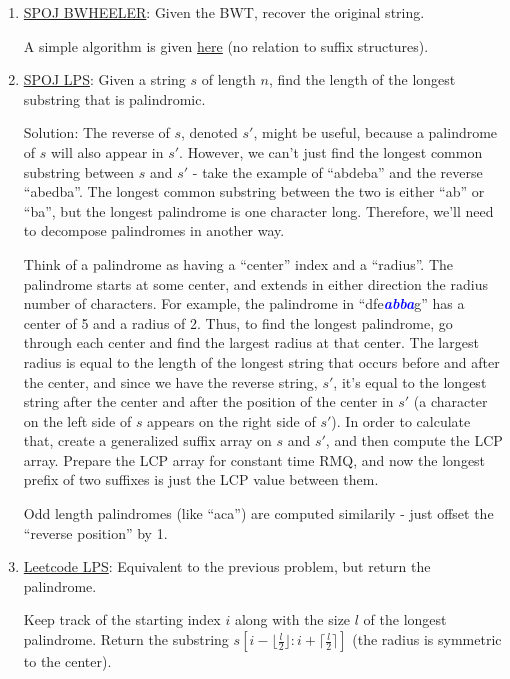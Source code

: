 \documentclass[11pt, oneside]{article}
\newcommand{\emphasis}[1]{\textcolor{blue}{\textbf{\textit{#1}}}}
\begin{document}
\begin{enumerate}
  \item \href{http://www.spoj.com/problems/BWHEELER/}{SPOJ BWHEELER}:
  Given the BWT, recover the original string.

  A simple algorithm is given \href{https://www.cs.helsinki.fi/u/tpkarkka/opetus/12s/spa/lecture11.pdf}{here} (no relation to suffix structures).

  \item \href{https://www.spoj.com/problems/LPS/}{SPOJ LPS}:
  Given a string \( s \) of length \( n \), find the length of the longest substring that is palindromic.

  Solution: The reverse of \( s \), denoted \( s' \), might be useful, because a palindrome of \( s \)
  will also appear in \( s' \). However, we can't just find the longest common substring
  between \( s \) and \( s' \) - take the example of ``abdeba'' and the reverse ``abedba''.
  The longest common substring between the two is either ``ab'' or ``ba'', but the longest palindrome
  is one character long. Therefore, we'll need to decompose palindromes in another way.

  Think of a palindrome as having a ``center'' index and a ``radius''.
  The palindrome starts at some center, and extends in either direction the radius number of characters.
  For example, the palindrome in ``dfe\emphasis{abba}g'' has a center of 5 and a radius of 2.
  Thus, to find the longest palindrome, go through each center and find the largest radius at that center.
  The largest radius is equal to the length of the longest string that occurs before and after the center,
  and since we have the reverse string, \( s' \), it's equal to the longest string after the center
  and after the position of the center in \( s' \)
  (a character on the left side of \( s \) appears on the right side of \( s' \)).
  In order to calculate that, create a generalized suffix array on \( s \) and \( s' \),
  and then compute the LCP array. Prepare the LCP array for constant time RMQ, and
  now the longest prefix of two suffixes is just the LCP value between them.

  Odd length palindromes (like ``aca'') are computed similarily - just offset the ``reverse position'' by 1.

  \item \href{https://leetcode.com/problems/longest-palindromic-substring/}{Leetcode LPS}:
  Equivalent to the previous problem, but return the palindrome.

  Keep track of the starting index \( i \) along with the size \( l \) of the longest palindrome.
  Return the substring \( s[i - \lfloor \frac{l}{2} \rfloor: i + \lceil \frac{l}{2} \rceil] \) (the radius is symmetric to the center).


\end{enumerate}
\end{document}
